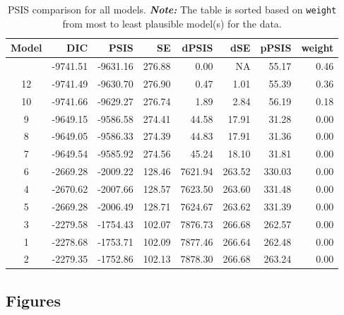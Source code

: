 \documentclass[
  authoryear,
  preprint,
  1p]{elsarticle}
\begin{document}
\begin{longtable}[]{@{}crrrrrrr@{}}

\caption{\label{tbl-rq3-psis}PSIS comparison for all models.
{\textbf{\emph{Note:}} The table is sorted based on \texttt{weight} from
most to least plausible model(s) for the data.}}

\tabularnewline

\toprule\noalign{}
Model & DIC & PSIS & SE & dPSIS & dSE & pPSIS & weight \\
\midrule\noalign{}
\endhead
\bottomrule\noalign{}
\endlastfoot
11 & -9741.51 & -9631.16 & 276.88 & 0.00 & NA & 55.17 & 0.46 \\
12 & -9741.49 & -9630.70 & 276.90 & 0.47 & 1.01 & 55.39 & 0.36 \\
10 & -9741.66 & -9629.27 & 276.74 & 1.89 & 2.84 & 56.19 & 0.18 \\
9 & -9649.15 & -9586.58 & 274.41 & 44.58 & 17.91 & 31.28 & 0.00 \\
8 & -9649.05 & -9586.33 & 274.39 & 44.83 & 17.91 & 31.36 & 0.00 \\
7 & -9649.54 & -9585.92 & 274.56 & 45.24 & 18.10 & 31.81 & 0.00 \\
6 & -2669.28 & -2009.22 & 128.46 & 7621.94 & 263.52 & 330.03 & 0.00 \\
4 & -2670.62 & -2007.66 & 128.57 & 7623.50 & 263.60 & 331.48 & 0.00 \\
5 & -2669.28 & -2006.49 & 128.71 & 7624.67 & 263.62 & 331.39 & 0.00 \\
3 & -2279.58 & -1754.43 & 102.07 & 7876.73 & 266.68 & 262.57 & 0.00 \\
1 & -2278.68 & -1753.71 & 102.09 & 7877.46 & 266.64 & 262.48 & 0.00 \\
2 & -2279.35 & -1752.86 & 102.13 & 7878.30 & 266.68 & 263.24 & 0.00 \\

\end{longtable}

\newpage{}

\subsection{Figures}\label{sec-appC}
\end{document}
